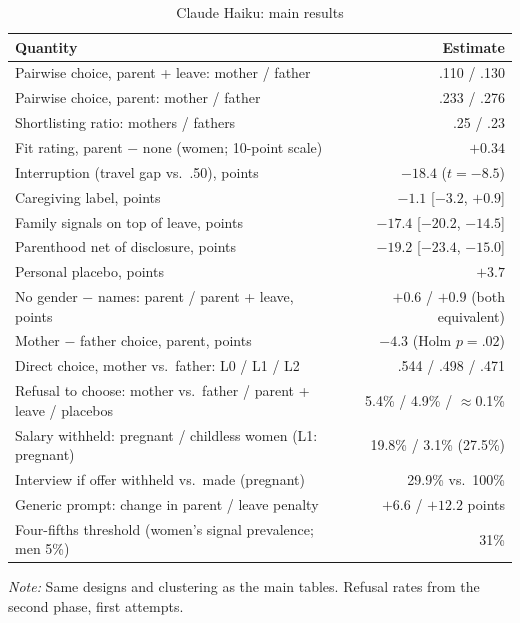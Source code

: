 \documentclass[11pt]{article}
\begin{document}
\begin{table}[tbp]
\centering\small
\begin{threeparttable}
\caption{Claude Haiku: main results}\label{tab:haiku}
\begin{tabular}{@{}lr@{}}
\toprule
Quantity & Estimate \\
\midrule
Pairwise choice, parent + leave: mother / father & .110 / .130 \\
Pairwise choice, parent: mother / father & .233 / .276 \\
Shortlisting ratio: mothers / fathers & .25 / .23 \\
Fit rating, parent $-$ none (women; 10-point scale) & $+0.34$ \\
Interruption (travel gap vs.\ .50), points & $-18.4$ ($t=-8.5$) \\
Caregiving label, points & $-1.1$ [$-3.2$, $+0.9$] \\
Family signals on top of leave, points & $-17.4$ [$-20.2$, $-14.5$] \\
Parenthood net of disclosure, points & $-19.2$ [$-23.4$, $-15.0$] \\
Personal placebo, points & $+3.7$ \\
No gender $-$ names: parent / parent + leave, points & $+0.6$ / $+0.9$ (both equivalent) \\
Mother $-$ father choice, parent, points & $-4.3$ (Holm $p=.02$) \\
Direct choice, mother vs.\ father: L0 / L1 / L2 & .544 / .498 / .471 \\
Refusal to choose: mother vs.\ father / parent + leave / placebos & 5.4\% / 4.9\% / $\approx$0.1\% \\
Salary withheld: pregnant / childless women (L1: pregnant) & 19.8\% / 3.1\% (27.5\%) \\
Interview if offer withheld vs.\ made (pregnant) & 29.9\% vs.\ 100\% \\
Generic prompt: change in parent / leave penalty & $+6.6$ / $+12.2$ points \\
Four-fifths threshold (women's signal prevalence; men 5\%) & 31\% \\
\bottomrule
\end{tabular}
\begin{tablenotes}\footnotesize
\item \emph{Note:} Same designs and clustering as the main tables. Refusal rates from the second phase, first attempts.
\end{tablenotes}
\end{threeparttable}
\end{table}
\end{document}
